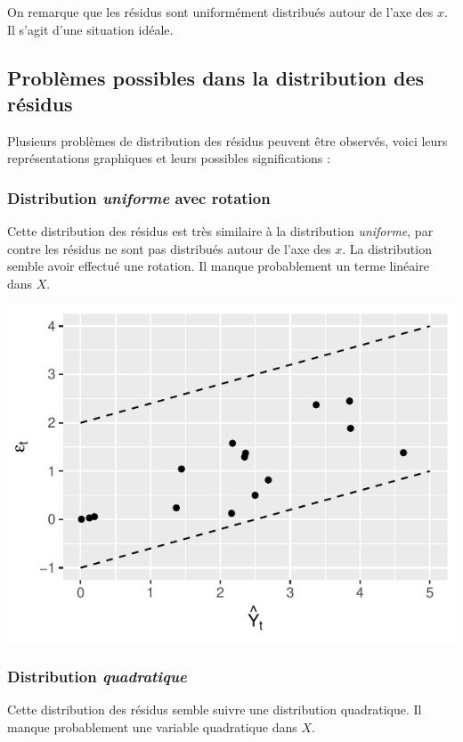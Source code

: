 \documentclass[11pt,french]{report}
\begin{document}
\bigskip
On remarque que les résidus sont uniformément distribués autour de l'axe des $x$. Il s'agit d'une situation idéale.

\subsection{Problèmes possibles dans la distribution des résidus}
Plusieurs problèmes de distribution des résidus peuvent être observés, voici leurs représentations graphiques et leurs possibles significations :

\subsubsection{Distribution \emph{uniforme} avec rotation}
Cette distribution des résidus est très similaire à la distribution \emph{uniforme}, par contre les résidus ne sont pas distribués autour de l'axe des $x$. La distribution semble avoir effectué une rotation. Il manque probablement un terme linéaire dans $X$.

\bigskip
\includegraphics{notes_de_cours-031}
\bigskip

\subsubsection{Distribution \emph{quadratique}}
Cette distribution des résidus semble suivre une distribution quadratique. Il manque probablement une variable quadratique dans $X$.
\end{document}
